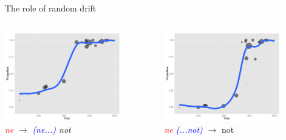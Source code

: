 \documentclass[compress]{beamer}
\begin{document}
\begin{frame}{The role of random drift}
\begin{columns}[T] 
   \begin{column}{.5\textwidth}
   \begin{center}
	 \includegraphics[width=2in]{lump-plot1.pdf}\\
	\emph{\textcolor{red}{ne}} $\rightarrow$ \emph{\textcolor{blue}{(ne...)} \textcolor{mygreen}{not}} 
   \end{center}
   \end{column}
   \begin{column}{.5\textwidth}
   \begin{center}
	\includegraphics[width=2in]{lump-plot2.pdf}\\
	\emph{\textcolor{red}{ne} \textcolor{blue}{(...not)}} $\rightarrow$ \textcolor{mygreen}{not}
    \end{center}
    \end{column}
  \end{columns}  
\end{frame}


\end{document}
